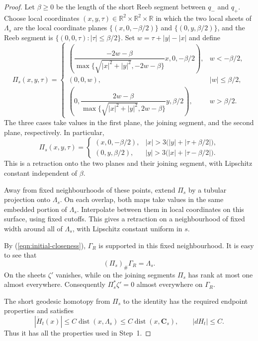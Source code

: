 \documentclass[11pt,a4paper]{article}
\numberwithin{equation}{section}
\theoremstyle{definition}
\theoremstyle{remark}
\newcommand{\R}{\mathbb R}
\newcommand{\dist}{\operatorname{dist}}
\begin{document}
\begin{proof}
		Let $\beta\ge0$ be the length of the short Reeb segment between
		$q_-$ and $q_+$. Choose local coordinates
		$(x,y,\tau)\in\R^2\times\R^2\times\R$ in which the two local sheets
		of $\Lambda_s$ are the local coordinate planes $\{(x,0,-\beta/2)\}$
		and $\{(0,y,\beta/2)\}$, and the Reeb segment is
		$\{(0,0,\tau):|\tau|\le\beta/2\}$.
		Set $w=\tau+|y|-|x|$ and define
		\[
		\Pi_s(x,y,\tau)=
		\begin{cases}
			\left(\dfrac{-2w-\beta}
			{\max\{\sqrt{|x|^2+|y|^2},-2w-\beta\}}x,0,-\beta/2\right),
			& w<-\beta/2,\\[8pt]
			(0,0,w),& |w|\le\beta/2,\\[4pt]
			\left(0,\dfrac{2w-\beta}
			{\max\{\sqrt{|x|^2+|y|^2},2w-\beta\}}y,\beta/2\right),
			& w>\beta/2.
		\end{cases}
		\]
		The three cases take values in the first plane, the joining segment,
		and the second plane, respectively. In particular,
		\[
		\Pi_s(x,y,\tau)=
		\begin{cases}
			(x,0,-\beta/2),& |x|>3\bigl(|y|+|\tau+\beta/2|\bigr),\\
			(0,y,\beta/2),& |y|>3\bigl(|x|+|\tau-\beta/2|\bigr).
		\end{cases}
		\]
		This is a retraction onto the two planes and their joining segment,
		with Lipschitz constant independent of $\beta$.
		
		Away from fixed neighbourhoods of these points, extend $\Pi_s$
		by a tubular projection onto $\Lambda_s$. On each overlap, both maps
		take values in the same embedded portion of $\Lambda_s$. Interpolate
		between them in local coordinates on this surface, using fixed cutoffs.
		This gives a retraction
		on a neighbourhood of fixed width around all of $\Lambda_s$, with Lipschitz
		constant uniform in $s$.
		
		By (\ref{eqn:initial-closeness}), $\Gamma_R$ is supported in this fixed neighbourhood.
		It is easy to see that
		\[
		(\Pi_s)_\#\Gamma_R=\Lambda_s.
		\]
		On the sheets $\zeta'$ vanishes, while on the joining segments
		$\Pi_s$ has rank at most one almost everywhere. Consequently
		$\Pi_s^*\zeta'=0$ almost everywhere on $\Gamma_R$.
		
		The short geodesic homotopy from $\Pi_s$ to the identity has the required
		endpoint properties and satisfies
		\[
		|\dot H_t(x)|\le C\dist(x,\Lambda_s)
		\le C\dist(x,\mathbf C_s),\qquad |dH_t|\le C.
		\]
		Thus it has all the properties used in Step~1.
	\end{proof}
	
\end{document}
